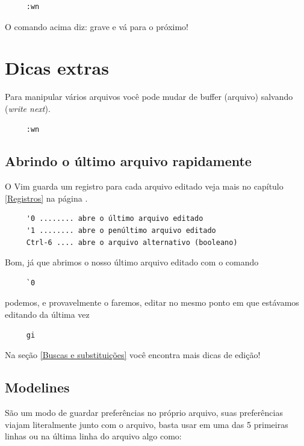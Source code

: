 \documentclass[10pt,a4paper,openany]{book}
\begin{document}
\begin{verbatim}
     :wn
\end{verbatim}

O comando acima diz: grave e vá para o próximo!

\section{Dicas extras}
\label{Dicas extras}

Para manipular vários arquivos você pode mudar de buffer (arquivo)
salvando ({\em write next}).

\begin{verbatim}
     :wn
\end{verbatim}



\subsection{Abrindo o último arquivo rapidamente}
O Vim guarda um registro para cada arquivo editado veja
mais no capítulo \ref{Registros} na página \pageref{Registros}.

\begin{verbatim}
     '0 ........ abre o último arquivo editado
     '1 ........ abre o penúltimo arquivo editado
     Ctrl-6 .... abre o arquivo alternativo (booleano)
\end{verbatim}

Bom, já que abrimos o nosso último arquivo editado com o comando

\begin{verbatim}
     `0
\end{verbatim}

podemos, e provavelmente o faremos, editar no mesmo ponto em que estávamos
editando da última vez

\begin{verbatim}
     gi
\end{verbatim}

Na seção \ref{Buscas e substituições} você encontra mais dicas de edição!


\subsection{Modelines}\label{sec:Modelines}

São um modo de guardar preferências no próprio arquivo, suas
preferências viajam literalmente junto com o arquivo, basta usar em
uma das 5 primeiras linhas ou na última linha do arquivo algo
como:
\end{document}

